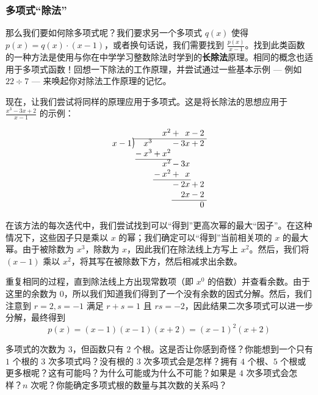 \subsubsection*{多项式``除法''}

那么我们要如何除多项式呢？我们要求另一个多项式 $q(x)$ 使得 $p(x) = q(x) \cdot (x - 1)$，或者换句话说，我们需要找到 $\frac{p(x)}{x-1}$。找到此类函数的一种方法是使用与你在中学学习整数除法时学到的\textbf{长除法}原理。相同的概念也适用于多项式函数！回想一下除法的工作原理，并尝试通过一些基本示例 --- 例如 $22 \div 7$ --- 来唤起你对除法工作原理的记忆。

现在，让我们尝试将同样的原理应用于多项式。这是将长除法的思想应用于 $\frac{x^3-3x+2}{x-1}$ 的示例：

\[
\arraycolsep=1pt
\begin{array}{*1r @{\hskip\arraycolsep}c@{\hskip\arraycolsep} *{9}r}
        &          &   &      &   & x^2 & + &  x & - & 2 &  \\
\cline{2-11}
x-1     & \longdiv &   & x^3  &   &  & -    & 3x & + & 2 &  \\
        &          & - & x^3  & + & x^2 &   &    &   &   &  \\
\cline{3-6}
        &          &   &      &   & x^2 & - & 3x &   &   &  \\
        &          &   &      & - & x^2 & + &  x &   &   &  \\
\cline{5-8}
        &          &   &      &   &     & - & 2x & + & 2 &  \\
        &          &   &      &   &     &   & 2x & - & 2 &  \\
\cline{7-11}
        &          &   &      &   &     &   &    &   & 0 &  \\
\end{array}
\]

在该方法的每次迭代中，我们尝试找到可以``得到''更高次幂的最大``因子''。在这种情况下，这些因子只是乘以 $x$ 的幂；我们确定可以``得到''当前相关项的 $x$ 的最大幂。由于被除数为 $x^3$，除数为 $x$，因此我们在除法线上方写上 $x^2$。然后，我们将 $(x-1)$ 乘以 $x^2$，将其写在被除数下方，然后相减求出余数。

重复相同的过程，直到除法线上方出现常数项（即 $x^0$ 的倍数）并查看余数。由于这里的余数为 $0$，所以我们知道我们得到了一个没有余数的因式分解。然后，我们注意到 $r=2, s=-1$ 满足 $r+s=1$ 且 $rs=-2$，因此结果二次多项式可以进一步分解，最终得到
\[p(x) = (x - 1)(x - 1)(x + 2) = (x - 1)^2(x + 2)\]

多项式的次数为 $3$，但函数只有 $2$ 个根。这是否让你感到奇怪？你能想到一个只有 $1$ 个根的 $3$ 次多项式吗？没有根的 $3$ 次多项式会是怎样？拥有 $4$ 个根、$5$ 个根或更多根呢？这有可能吗？为什么可能或为什么不可能？如果是 $4$ 次多项式会怎样？$n$ 次呢？你能确定多项式根的数量与其次数的关系吗？

